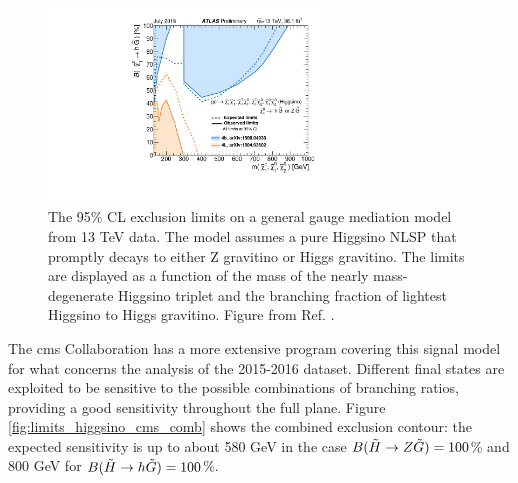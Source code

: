 \begin{figure}[htbp]
	\centering
	\includegraphics[width=0.65\textwidth]{figures/summary_plots/ATLAS_SUSY_EWSummary_GGM.pdf}
	\caption{The 95\% CL exclusion limits on a general gauge mediation model from 13 TeV data. 
	The model assumes a pure Higgsino NLSP that promptly decays to either Z gravitino or Higgs gravitino. 
	The limits are displayed as a function of the mass of the nearly mass-degenerate Higgsino triplet and the branching fraction of lightest Higgsino to Higgs gravitino. 	Figure from Ref. \cite{atlasSUSYSummary}.
	} 
	\label{fig:summary_atlas_higgsino_GMSB}
\end{figure}

The \gls{cms} Collaboration has a more extensive program covering this signal model for what concerns the analysis of the 
2015-2016 dataset. 
Different final states are exploited to be sensitive to the possible combinations of branching ratios, 
providing a good sensitivity throughout the full plane.
Figure \ref{fig:limits_higgsino_cms_comb} shows the combined exclusion contour: the expected sensitivity is up to about 580 GeV in the case $B(\tilde{H}\rightarrow Z \tilde{G})=100$\% and 800 GeV for 
$B(\tilde{H}\rightarrow h \tilde{G})=100$\%.

